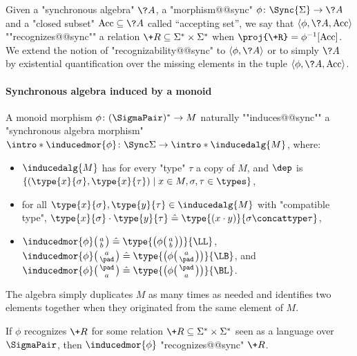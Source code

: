 Given a "synchronous algebra" $\?A$, a "morphism@@sync" $\phi\colon \Sync{\Sigma} \to \?A$
and a "closed subset" $\Acc \subseteq \?A$ called ``accepting set'',
we say that $\langle \phi, \?A, \Acc \rangle$
\AP""recognizes@@sync"" a relation $\+R \subseteq \Sigma^* \times \Sigma^*$
when $\proj{\+R} = \phi^{-1}[\Acc]$.
We extend the notion of "recognizability@@sync" to $\langle \phi, \?A\rangle$
or to simply $\?A$ by existential quantification over the missing elements in the tuple $\langle \phi, \?A, \Acc \rangle$.

\paragraph*{Synchronous algebra induced by a monoid}
A monoid morphism $\phi\colon (\SigmaPair)^* \to M$
naturally ""induces@@sync"" a "synchronous algebra morphism"
\AP$\intro*\inducedmor{\phi} \colon \Sync\Sigma \to \intro*\inducedalg{M}$,
where:
\begin{itemize}
	\item $\inducedalg{M}$ has for every "type" $\tau$ a copy of $M$,
	and $\dep$ is $\{(\type{x}{\sigma}, \type{x}{\tau}) \mid x \in M, \sigma, \tau \in \types\}$,
	\item for all $\type{x}{\sigma}, \type{y}{\tau} \in \inducedalg{M}$
	with "compatible type", $\type{x}{\sigma} \cdot \type{y}{\tau} \defeq \type{(x\cdot y)}{\sigma\concattype\tau}$,
	\item $\inducedmor{\phi}\pair{a}{b} \defeq \type{\bigl(\phi\pair{a}{b}\bigr)}{\LL}$,
		$\inducedmor{\phi}\pair{a}{\pad} \defeq \type{\bigl(\phi\pair{a}{\pad}\bigr)}{\LB}$,
		and $\inducedmor{\phi}\pair{\pad}{a} \defeq \type{\bigl(\phi\pair{\pad}{a}\bigr)}{\BL}$.
\end{itemize}
The algebra simply duplicates $M$ as many times as needed and identifies
two elements together when they originated from the same element of $M$.
\begin{fact}
	\AP\label{fact:induced-morphism}
	If $\phi$ recognizes $\+R$ for some relation $\+R \subseteq \Sigma^* \times \Sigma^*$ seen as a language over $\SigmaPair$, then $\inducedmor{\phi}$ "recognizes@@sync" $\+R$.
\end{fact}

